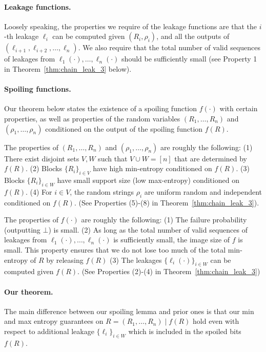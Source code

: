 \paragraph{Leakage functions.}
Loosely speaking, the properties we require of the leakage functions are that
the $i$-th leakage $\ell_i$ can be computed given $(R_i, \rho_i)$, and all the
outputs of $(\ell_{i+1}, \ell_{i+2}, \ldots, \ell_n)$. We also require that the
total number of valid sequences of leakages from $\ell_1(\cdot), \ldots,
\ell_n(\cdot)$ should be sufficiently small (see Property 1 in
Theorem~\ref{thm:chain_leak_3} below).

\paragraph{Spoiling functions.}
Our theorem below states the existence of a spoiling function $f(\cdot)$ with
certain properties, as well as properties of the random variables
$(R_1,\dots,R_n)$ and $(\rho_1, \ldots, \rho_n)$ conditioned on the output of
the spoiling function $f(R)$.

The properties of $(R_1,\dots,R_n)$ and $(\rho_1, \ldots, \rho_n)$ are roughly the following:
(1) There exist disjoint sets $V, W$ such that $V \cup W = [n]$ that are determined by $f(R)$.
(2) Blocks $\{R_i\}_{i \in V}$ have high min-entropy conditioned on $f(R)$. 
(3) Blocks $\{R_i\}_{i \in W}$ have small support size (low max-entropy) conditioned on $f(R)$.
(4) For $i \in V$, the random strings
$\rho_i$ are uniform random and independent conditioned on $f(R)$.
(See Properties (5)-(8) in Theorem~\ref{thm:chain_leak_3}).

The properties of $f(\cdot)$ are roughly the following:
(1) The failure probability (outputting $\bot$) is small.
(2) As long as the total number of valid sequences of leakages
from $\ell_1(\cdot), \ldots, \ell_n(\cdot)$ is sufficiently small, the image size of $f$ is small.
This property ensures that we do not lose too much of the total min-entropy of $R$ by releasing $f(R)$
(3) The leakages $\{\ell_i(\cdot)\}_{i \in W}$ can be computed given $f(R)$.
(See Properties (2)-(4) in Theorem~\ref{thm:chain_leak_3})

\paragraph{Our theorem.}
The main difference between our spoiling lemma and prior ones is that our min and max entropy guarantees on $R = (R_1,\dots,R_n) \mid f(R)$
hold even with respect to additional leakage $\{\ell_i\}_{i \in W}$ which is included in the spoiled bits $f(R)$.

